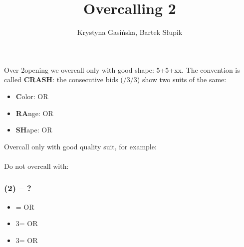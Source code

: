 \documentclass[12pt, a4paper]{article}
\title{Overcalling 2\ntx}
\author{Krystyna Gasińska, Bartek Słupik}
\begin{document}
\maketitle

Over 2\nt opening we overcall only with good shape: 5+5+xx.
The convention is called {\color{Red}\textbf{C}}{\color{Green}\textbf{RA}}{\color{Blue}\textbf{SH}}:
the consecutive bids (\dbl/3\clubs/3\diams) show two suits of the same: 
\begin{itemize}
    \item {\color{Red}\textbf{C}}olor: \twosuit{\clubs}{\spades} OR \twosuit{\diams}{\hearts}
    \item {\color{Green}\textbf{RA}}nge: \twosuit{\clubs}{\diams} OR \twosuit{\hearts}{\spades}
    \item {\color{Blue}\textbf{SH}}ape: \twosuit{\clubs}{\hearts} OR \twosuit{\diams}{\spades}
\end{itemize}
Overcall only with good quality suit, for example:\\
\\
Do not overcall with:\\


\subsubsection*{(2\nt) -- ?}
\begin{itemize}
    \item \dbl = \twosuit{\clubs}{\spades} OR \twosuit{\diams}{\hearts}
    \item 3\clubs = \twosuit{\clubs}{\diams} OR \twosuit{\hearts}{\spades}
    \item 3\diams = \twosuit{\clubs}{\hearts} OR \twosuit{\diams}{\spades}
\end{itemize}

\end{document}
